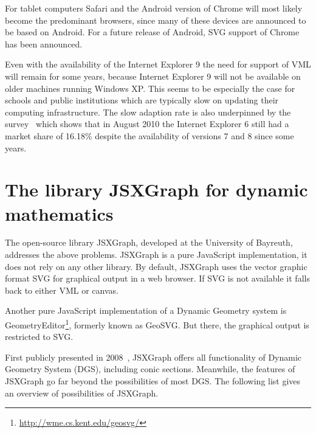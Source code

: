 \documentclass[12pt,a4paper]{article}%
\begin{document}
For tablet computers Safari and the Android version of Chrome will most likely become the
predominant browsers, since many of these devices are announced to be based on Android.
For a future release of Android, SVG support of Chrome has been announced.

Even with the availability of the Internet Explorer 9 the need for support of
VML will remain for some years, because Internet Explorer 9 will not be available 
on older machines running Windows XP.
This seems to be especially the case for schools and public institutions which are
typically slow on updating their computing infrastructure. 
The slow adaption rate is also underpinned by the survey~\cite{netapplications} which
shows that in August 2010 the Internet Explorer 6 still had a market share of 16.18\%
despite the availability of versions 7 and 8 since some years.


\section{The library JSXGraph for dynamic mathematics}
The open-source library JSXGraph, developed at the University of Bayreuth, 
addresses the above problems.
JSXGraph is a pure JavaScript implementation, it does not rely on any other 
library. By default, JSXGraph uses the vector graphic format SVG
for graphical output in a web browser. If SVG is not available it falls
back to either VML or canvas.

Another pure JavaScript implementation of a Dynamic Geometry system is
GeometryEditor\footnote{\href{http://wme.cs.kent.edu/geosvg/}{http://wme.cs.kent.edu/geosvg/}}, 
formerly known as GeoSVG. But there, the graphical output is restricted to SVG.

First publicly presented in 2008~\cite{ehmann2008}, JSXGraph offers all 
functionality of Dynamic Geometry System (DGS), including conic sections.
Meanwhile, the features of JSXGraph go far beyond the possibilities
of most DGS.
The following list gives an overview of possibilities of JSXGraph.
\end{document}
